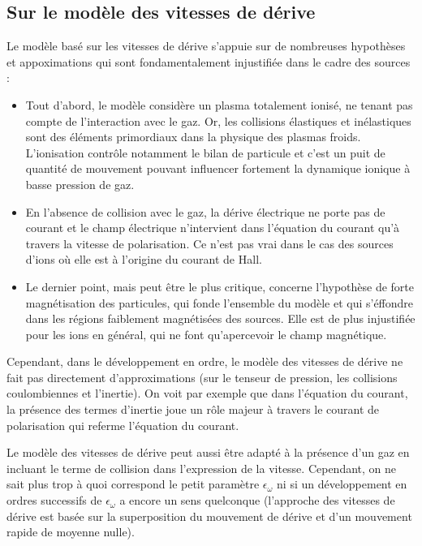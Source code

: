 \begin{refsection}
\subsection{Sur le modèle des vitesses de dérive}
Le modèle basé sur les vitesses de dérive s'appuie sur de nombreuses
hypothèses et appoximations qui sont fondamentalement injustifiée dans le cadre
des sources :

\begin{itemize}
  \item Tout d'abord, le modèle considère un plasma totalement ionisé, ne tenant
  pas compte de l'interaction avec le gaz. Or, les collisions élastiques et
  inélastiques sont des éléments primordiaux dans la physique des plasmas froids. L'ionisation contrôle
  notamment le bilan de particule et c'est un puit de quantité de mouvement
  pouvant influencer fortement la dynamique ionique à basse pression de gaz.
  \item En l'absence de collision avec le gaz, la dérive électrique ne porte pas
  de courant et le champ électrique n'intervient dans l'équation du courant qu'à
  travers la vitesse de polarisation. Ce n'est pas vrai dans le cas des sources
  d'ions où elle est à l'origine du courant de Hall.
  \item Le dernier point, mais peut être le plus critique, concerne l'hypothèse
  de forte magnétisation des particules, qui fonde l'ensemble du modèle et qui
  s'éffondre dans les régions faiblement magnétisées des sources. Elle est de
  plus injustifiée pour les ions en général, qui ne font qu'apercevoir le champ
  magnétique.
\end{itemize}

Cependant, dans le développement en ordre, le modèle des vitesses de
dérive ne fait pas directement d'approximations (sur le tenseur de pression, les
collisions coulombiennes et l'inertie). On voit par exemple que dans l'équation
du courant, la présence des termes d'inertie joue un rôle majeur à travers le
courant de polarisation qui referme l'équation du courant.

Le modèle des vitesses de dérive peut aussi être adapté à la présence d'un gaz
en incluant le terme de collision dans l'expression de la vitesse. Cependant, 
on ne sait plus trop à quoi correspond le petit paramètre $\epsilon_\omega$ ni
si un développement en ordres successifs de $\epsilon_\omega$ a encore 
un sens quelconque (l'approche des vitesses de dérive est basée sur la
superposition du mouvement de dérive et d'un mouvement rapide de moyenne nulle).


\end{refsection}
